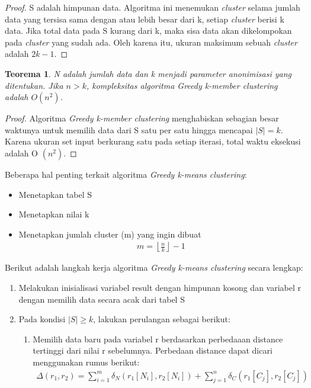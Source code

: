 \documentclass[a4paper,twoside]{article}
\newtheorem{theorem}{Teorema}
\begin{document}
\begin{enumerate}
\begin{proof}
S adalah himpunan data. Algoritma ini menemukan \textit{cluster} selama jumlah data yang tersisa sama dengan atau lebih besar dari k, setiap \textit{cluster} berisi k data. Jika total data pada S kurang dari k, maka sisa data akan dikelompokan pada  \textit{cluster} yang sudah ada. Oleh karena itu, ukuran maksimum sebuah \textit{cluster} adalah $2k - 1$.
\end{proof}

\begin{theorem}
N adalah jumlah data dan k menjadi parameter anonimisasi yang ditentukan. Jika $n > k$, kompleksitas algoritma \textit{Greedy k-member clustering} adalah $O(n^2)$.
\end{theorem}

\begin{proof}
Algoritma \textit{Greedy k-member clustering} menghabiskan sebagian besar waktunya untuk memilih data dari S satu per satu hingga mencapai $|S| = k$. Karena ukuran set input berkurang satu pada setiap iterasi, total waktu eksekusi adalah O $(n^2)$.
\end{proof}

\noindent Beberapa hal penting terkait algoritma \textit{Greedy k-means clustering}:

\begin{itemize}
\item Menetapkan tabel S  
\item Menetapkan nilai k
\item Menetapkan jumlah cluster (m) yang ingin dibuat
\begin{align}
m = \left \lfloor \frac{n}{k} \right \rfloor - 1
\end{align}
\end{itemize}


\noindent Berikut adalah langkah kerja algoritma \textit{Greedy k-means clustering} secara lengkap:

\begin{enumerate}
\item Melakukan inisialisasi variabel result dengan himpunan kosong dan variabel r dengan memilih data secara acak dari tabel S

\item Pada kondisi $|S| \geq k$, lakukan perulangan sebagai berikut:

\begin{enumerate}
\item Memilih data baru pada variabel r berdasarkan perbedaaan distance tertinggi dari nilai r sebelumnya. Perbedaan distance dapat dicari menggunakan rumus berikut:
\begin{align*}
\Delta (r_1,r_2) = \sum_{i=1}^{m} \delta_N(r_1[N_i],r_2	[N_i]) +  \sum_{j=1}^{n} \delta_C(r_1[C_j],r_2[C_j])
\end{align*}


\end{enumerate}
\end{enumerate}
\end{enumerate}
\end{document}
